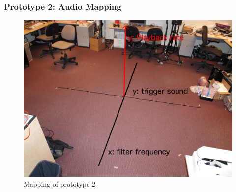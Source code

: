 \documentclass{beamer}
\begin{document}

\begin{frame}
	\frametitle{Prototype 2: Audio Mapping}
	\begin{figure}
	\includegraphics[width = .9\textwidth]{figs/prototype2_circle.png}
	\caption{Mapping of prototype 2}	
	\end{figure}
\end{frame}
\end{document}
